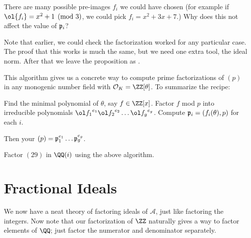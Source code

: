 \begin{ques}
	There are many possible pre-images $f_i$ we could have chosen
	(for example if $\ol{f_i} = x^2+1 \pmod 3$, we could pick $f_i = x^2 + 3x + 7$.)
	Why does this not affect the value of $\mathfrak p_i$?
\end{ques}

Note that earlier, we could check the factorization worked
for any particular case. 
The proof that this works is much the same, but we need one extra tool, the ideal norm.
After that we leave the proposition as .

This algorithm gives us a concrete way to compute prime factorizations of $(p)$
in any monogenic number field with $\OO_K = \ZZ[\theta]$. To summarize the recipe:
\begin{enumerate}
	\ii Find the minimal polynomial of $\theta$, say $f \in \ZZ[x]$.
	\ii Factor $f$ mod $p$ into irreducible polynomials ${\ol f_1}^{e_1} {\ol f_2}^{e_2} \dots {\ol f_g}^{e_g}$.
	\ii Compute $\mathfrak p_i = (f_i(\theta), p)$ for each $i$.
\end{enumerate}
Then your $(p) = \mathfrak p_1^{e_1} \dots \mathfrak p_g^{e_g}$.

\begin{exercise}
	Factor $(29)$ in $\QQ(i)$ using the above algorithm.
\end{exercise}


\section{Fractional Ideals}
We now have a neat theory of factoring ideals of $\mathcal A$,
just like factoring the integers.
Now note that our factorization of $\ZZ$ naturally gives a way to factor
elements of $\QQ$; just factor the numerator and denominator separately.


